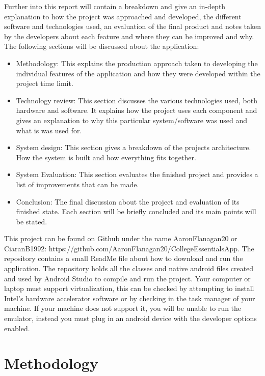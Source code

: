 Further into this report will contain a breakdown and give an in-depth explanation to how the project was approached and developed, the different software and technologies used, an evaluation of the final product and notes taken by the developers about each feature and where they can be improved and why. The following sections will be discussed about the application:
\begin{itemize}
\item Methodology: This explains the production approach taken to developing the individual features of the application and how they were developed within the project time limit.
\item Technology review: This section discusses the various technologies used, both hardware and software. It explains how the project uses each component and gives an explanation to why this particular system/software was used and what is was used for.
\item System design: This section gives a breakdown of the projects architecture. How the system is built and how everything fits together.
\item System Evaluation: This section evaluates the finished project and provides a list of improvements that can be made.
\item Conclusion: The final discussion about the project and evaluation of its finished state. Each section will be briefly concluded and its main points will be stated.
\end{itemize}

This project can be found on Github under the name AaronFlanagan20 or CiaranB1992: https://github.com/AaronFlanagan20/CollegeEssentialsApp.
The repository contains a small ReadMe file about how to download and run the application. The repository holds all the classes and native android files created and used by Android Studio to compile and run the project. Your computer or laptop must support virtualization, this can be checked by attempting to install Intel's hardware accelerator software or by checking in the task manager of your machine. If your machine does not support it, you will be unable to run the emulator, instead you must plug in an android device with the developer options enabled.

\chapter{Methodology}
